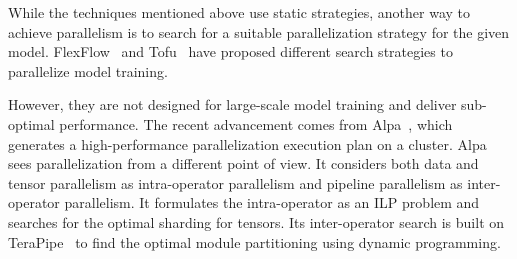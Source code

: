 While the techniques mentioned above use static strategies, another way to achieve parallelism is to search for a suitable parallelization strategy for the given model. FlexFlow~\cite{flexflow} and Tofu~\cite{tofu} have proposed different search strategies to parallelize model training. 

However, they are not designed for large-scale model training and deliver sub-optimal performance. The recent advancement comes from Alpa~\cite{zheng2022alpa}, which generates a high-performance parallelization execution plan on a cluster. 
Alpa sees parallelization from a different point of view. It considers both data and tensor parallelism as intra-operator parallelism and pipeline parallelism as inter-operator parallelism. 
It formulates the intra-operator as an ILP problem and searches for the optimal sharding for tensors.
Its inter-operator search is built on TeraPipe~\cite{terapipe} to find the optimal module partitioning using dynamic programming. 









